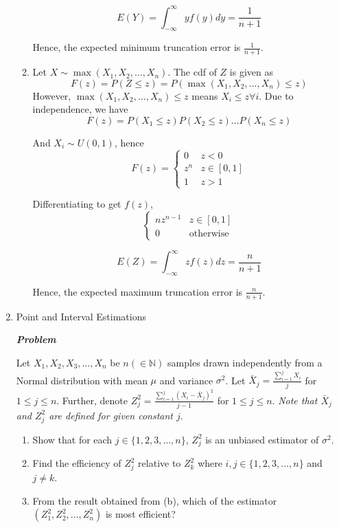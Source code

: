 \documentclass[12pt, oneside]{article}
\begin{document}
\begin{enumerate}
\begin{enumerate}
    \[E(Y) = \int_{-\infty}^\infty yf(y)dy = \frac{1}{n+1} \]
    
    Hence, the expected minimum truncation error is $\frac{1}{n+1}$.
    
    \item
    Let $X \sim \max(X_1,X_2,...,X_n)$. The cdf of $Z$ is given as
    \[ F(z) = P(Z \le z) = P(\max(X_1,X_2,...,X_n) \le z)\]
    However, $\max(X_1,X_2,...,X_n) \le z$ means $X_i\le z \forall i$. Due to independence, we have
    \[ F(z) = P(X_1 \le z)P(X_2 \le z)\dots P(X_n \le z)\]
    
    And $X_i \sim U(0,1)$, hence 
    \[ 
    F(z) = 
    \begin{cases}
        0 & z <0 \\
        z^n & z \in [0,1] \\
        1 & z>1
    \end{cases}
    \]
    
    Differentiating to get $f(z)$,
    \[\begin{cases}
        nz^{n-1} & z \in [0,1] \\
        0 & \text{otherwise}
    \end{cases}
    \]
    
    \[E(Z) = \int_{-\infty}^\infty zf(z)dz = \frac{n}{n+1} \]
    
    Hence, the expected maximum truncation error is $\frac{n}{n+1}$.
    
    
    

\end{enumerate}
    

\item	Point and Interval Estimations

\textit{\textbf{Problem}}

Let $X_1,X_2,X_3,\dots,X_n$ be $n(\in \mathbb{N})$ samples drawn independently from a Normal distribution with mean $\mu$ and variance $\sigma^2$. Let $\bar X_j = \frac{\sum_{i=1}^{j} X_i}{j}$ for $1 \le j \le n$. Further, denote $Z_j^2 = \frac{\sum_{i=1}^{j} (X_i - \bar X_j)^2}{j-1}$ for $1 \le j \le n$. \textit{Note that $\bar X_j$ and $Z_j^2$ are defined for given constant $j$}.
\begin{enumerate}
    \item Show that for each $j \in \{1,2,3,
    \dots,n\}$, $Z_j^2$ is an unbiased estimator of $\sigma^2$.
    \item Find the efficiency of $Z_j^2$ relative to $Z_k^2$ where $i,j \in \{1,2,3,\dots,n\}$ and $j\ne k$.
    \item From the result obtained from (b), which of the estimator $(Z_1^2,Z_2^2,\dots,Z_n^2)$ is most efficient?
\end{enumerate}


\end{enumerate}
\end{document}
